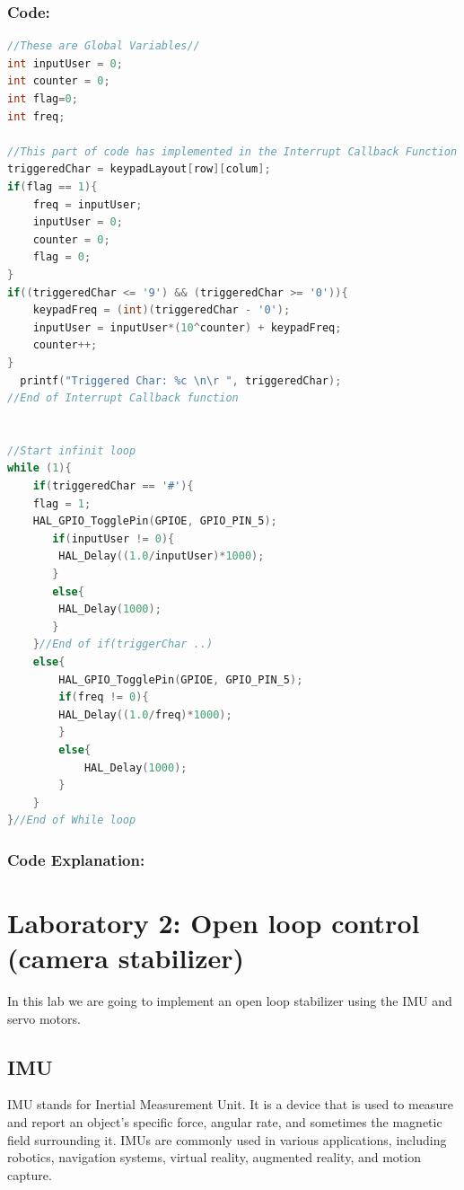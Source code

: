 \documentclass[english]{article}
\begin{document}
\subsubsection{Code:}
\begin{lstlisting}[language=C, caption={C code using listings}, label={lst:label} ]
//These are Global Variables//
int inputUser = 0;
int counter = 0;
int flag=0;
int freq;

//This part of code has implemented in the Interrupt Callback Function
triggeredChar = keypadLayout[row][colum];
if(flag == 1){
    freq = inputUser;
    inputUser = 0;
    counter = 0;
    flag = 0;
}
if((triggeredChar <= '9') && (triggeredChar >= '0')){
    keypadFreq = (int)(triggeredChar - '0');
    inputUser = inputUser*(10^counter) + keypadFreq;
    counter++;
}
  printf("Triggered Char: %c \n\r ", triggeredChar);
//End of Interrupt Callback function


//Start infinit loop
while (1){
    if(triggeredChar == '#'){
	flag = 1;
	HAL_GPIO_TogglePin(GPIOE, GPIO_PIN_5);
	   if(inputUser != 0){
		HAL_Delay((1.0/inputUser)*1000);
	   }
	   else{
		HAL_Delay(1000);
	   }
    }//End of if(triggerChar ..)
    else{
        HAL_GPIO_TogglePin(GPIOE, GPIO_PIN_5);
        if(freq != 0){
        HAL_Delay((1.0/freq)*1000);
        }
        else{
            HAL_Delay(1000);
        }
    }
}//End of While loop
\end{lstlisting}
\subsubsection{Code Explanation:}
\newpage
\section{Laboratory 2: Open loop control (camera stabilizer)}
In this lab we are going to implement an open loop stabilizer
using the IMU and servo motors.
\subsection{IMU}
IMU stands for Inertial Measurement Unit. It is a device that is used 
to measure and report an object's specific force, angular rate, and 
sometimes the magnetic field surrounding it. IMUs are commonly used in
 various applications, including robotics, navigation systems, virtual 
 reality, augmented reality, and motion capture.\newline
\end{document}
